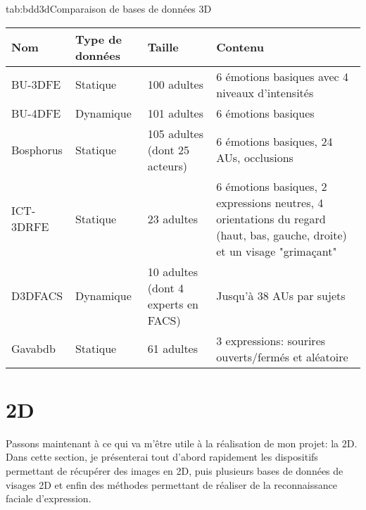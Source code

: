 \documentclass[overfullbox, poster]{polytech/polytech}
\begin{document}
\begin{Table}{tab:bdd3d}{Comparaison de bases de données 3D}
	\begin{tabular}{|p{2.5cm}|p{2cm}|p{3.5cm}|p{6cm}|}
		\hline
		\textbf{Nom} &\textbf{Type de données} &\textbf{Taille} &\textbf{Contenu}\\\hline
		BU-3DFE\cite{bu3dfe_article} &Statique &100 adultes &6 émotions basiques avec 4 niveaux d'intensités\\
		BU-4DFE\cite{bu4dfe_article} &Dynamique &101 adultes &6 émotions basiques\\
		Bosphorus\cite{bosphorus_article} &Statique &105 adultes (dont 25 acteurs) &6 émotions basiques, 24 AUs, occlusions\\
		ICT-3DRFE\cite{ict_3drfe} &Statique &23 adultes &6 émotions basiques, 2 expressions neutres, 4 orientations du regard (haut, bas, gauche, droite) et un visage "grimaçant"\\
		D3DFACS\cite{d3dfacs} &Dynamique &10 adultes (dont 4 experts en FACS) &Jusqu'à 38 AUs par sujets\\
		Gavabdb\cite{gavabdb} &Statique &61 adultes &3 expressions: sourires ouverts/fermés et aléatoire\\\hline
	\end{tabular}
\end{Table}


\newpage
\section{2D}
\label{sec:2d}
Passons maintenant à ce qui va m'être utile à la réalisation de mon projet: la 2D.\\
Dans cette section, je présenterai tout d'abord rapidement les dispositifs permettant de récupérer des images en 2D, puis plusieurs bases de données de visages 2D et enfin des méthodes permettant de réaliser de la reconnaissance faciale d'expression.\\
\end{document}
